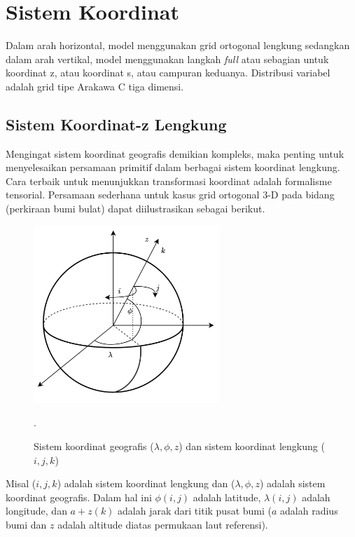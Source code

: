 \section[Sistem Koordinat]{Sistem Koordinat}
\begin{spacing}{1.5}
	Dalam arah horizontal, model menggunakan grid ortogonal lengkung sedangkan dalam arah vertikal, model menggunakan langkah \textit{full} atau sebagian untuk koordinat z, atau koordinat s, atau campuran keduanya. Distribusi variabel adalah grid tipe Arakawa C tiga dimensi.
\subsection[Sistem Koordinat-z Lengkung]{Sistem Koordinat-z Lengkung}
	Mengingat sistem koordinat geografis demikian kompleks, maka penting untuk menyelesaikan persamaan primitif dalam berbagai sistem koordinat lengkung. Cara terbaik untuk menunjukkan transformasi koordinat adalah formalisme tensorial. Persamaan sederhana untuk kasus grid ortogonal 3-D pada bidang (perkiraan bumi bulat) dapat diilustrasikan sebagai berikut.
	\begin{figure}[H]
		\centering
		\includegraphics[width=7cm]{contents/sphere.png}
		\caption{Sistem koordinat geografis ($\lambda, \phi,z$) dan sistem koordinat lengkung ($i,j,k$) \protect{}}.
		\label{fig:sphere}
	\end{figure}
	Misal ($i,j,k$) adalah sistem koordinat lengkung dan ($\lambda, \phi,z$) adalah sistem koordinat geografis. Dalam hal ini $\phi(i,j)$ adalah latitude, $\lambda(i,j)$ adalah longitude, dan $a+z(k)$ adalah jarak dari titik pusat bumi ($a$ adalah radius bumi dan $z$ adalah altitude diatas permukaan laut referensi).
	

\end{spacing}
